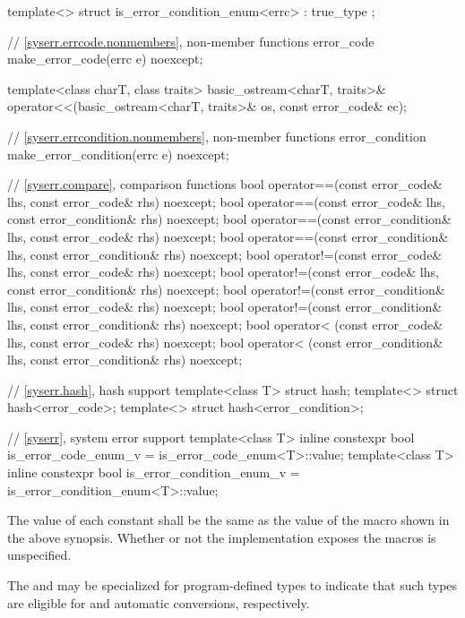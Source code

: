 \begin{codeblock}
{  template<> struct is_error_condition_enum<errc> : true_type {};

  // \ref{syserr.errcode.nonmembers}, non-member functions
  error_code make_error_code(errc e) noexcept;

  template<class charT, class traits>
    basic_ostream<charT, traits>&
      operator<<(basic_ostream<charT, traits>& os, const error_code& ec);

  // \ref{syserr.errcondition.nonmembers}, non-member functions
  error_condition make_error_condition(errc e) noexcept;

  // \ref{syserr.compare}, comparison functions
  bool operator==(const error_code& lhs, const error_code& rhs) noexcept;
  bool operator==(const error_code& lhs, const error_condition& rhs) noexcept;
  bool operator==(const error_condition& lhs, const error_code& rhs) noexcept;
  bool operator==(const error_condition& lhs, const error_condition& rhs) noexcept;
  bool operator!=(const error_code& lhs, const error_code& rhs) noexcept;
  bool operator!=(const error_code& lhs, const error_condition& rhs) noexcept;
  bool operator!=(const error_condition& lhs, const error_code& rhs) noexcept;
  bool operator!=(const error_condition& lhs, const error_condition& rhs) noexcept;
  bool operator< (const error_code& lhs, const error_code& rhs) noexcept;
  bool operator< (const error_condition& lhs, const error_condition& rhs) noexcept;

  // \ref{syserr.hash}, hash support
  template<class T> struct hash;
  template<> struct hash<error_code>;
  template<> struct hash<error_condition>;

  // \ref{syserr}, system error support
  template<class T>
    inline constexpr bool is_error_code_enum_v = is_error_code_enum<T>::value;
  template<class T>
    inline constexpr bool is_error_condition_enum_v = is_error_condition_enum<T>::value;
}
\end{codeblock}

\pnum The value of each  constant shall be the same as
the value of the  macro shown in the above synopsis. Whether
or not the  implementation exposes the 
macros is unspecified.

\pnum
The  and  may be
specialized for program-defined types to indicate that such types are eligible
for  and  automatic
conversions, respectively.

